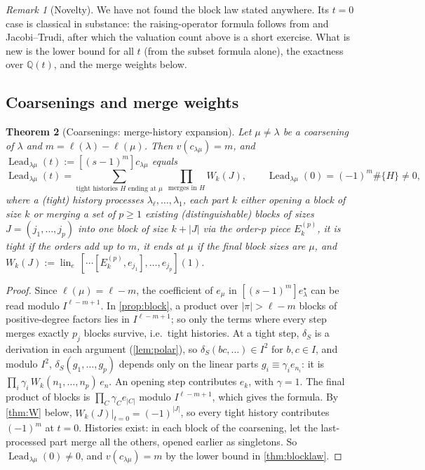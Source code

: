 \documentclass[11pt]{amsart}
\newtheorem{theorem}{Theorem}[section]
\theoremstyle{definition}
\theoremstyle{remark}
\newtheorem{remark}[theorem]{Remark}
\numberwithin{equation}{section}
\newcommand{\lin}{\operatorname{lin}_e}
\newcommand{\Lead}{\operatorname{Lead}}
\newcommand{\val}{v}
\begin{document}
\begin{remark}[Novelty]
We have not found the block law stated anywhere. Its $t=0$ case is classical in substance: the raising-operator formula follows from \cite[eq.~(11)]{DLT94} and Jacobi--Trudi, after which the valuation count above is a short exercise. What is new is the lower bound for all $t$ (from the subset formula alone), the exactness over $\mathbb{Q}(t)$, and the merge weights below.
\end{remark}

\subsection{Coarsenings and merge weights}
\begin{theorem}[Coarsenings: merge-history expansion]\label{thm:coarse}
Let $\mu\neq\lambda$ be a coarsening of $\lambda$ and $m=\ell(\lambda)-\ell(\mu)$. Then $\val(c_{\lambda\mu})=m$, and $\Lead_{\lambda\mu}(t):=[(s-1)^m]c_{\lambda\mu}$ equals
\[ \Lead_{\lambda\mu}(t)=\sum_{\text{tight histories }H\text{ ending at }\mu}\ \prod_{\text{merges in }H}W_k(J),\qquad \Lead_{\lambda\mu}(0)=(-1)^m\#\{H\}\neq0, \]
where a (tight) history processes $\lambda_\ell,\dots,\lambda_1$, each part $k$ either opening a block of size $k$ or merging a set of $p\ge1$ existing (distinguishable) blocks of sizes $J=(j_1,\dots,j_p)$ into one block of size $k+|J|$ via the order-$p$ piece $E_k^{(p)}$, it is tight if the orders add up to $m$, it ends at $\mu$ if the final block sizes are $\mu$, and $W_k(J):=\lin\,[\cdots[E_k^{(p)},e_{j_1}],\dots,e_{j_p}](1)$.
\end{theorem}
\begin{proof}
Since $\ell(\mu)=\ell-m$, the coefficient of $e_\mu$ in $[(s-1)^m]e^\star_\lambda$ can be read modulo $I^{\ell-m+1}$. In \cref{prop:block}, a product over $|\pi|>\ell-m$ blocks of positive-degree factors lies in $I^{\ell-m+1}$; so only the terms where every step merges exactly $p_j$ blocks survive, i.e.\ tight histories. At a tight step, $\delta_S$ is a derivation in each argument (\cref{lem:polar}), so $\delta_S(bc,\dots)\in I^2$ for $b,c\in I$, and modulo $I^2$, $\delta_S(g_1,\dots,g_p)$ depends only on the linear parts $g_i\equiv\gamma_ie_{n_i}$: it is $\prod_i\gamma_i\,W_k(n_1,\dots,n_p)\,e_n$. An opening step contributes $e_k$, with $\gamma=1$. The final product of blocks is $\prod_C\gamma_Ce_{|C|}$ modulo $I^{\ell-m+1}$, which gives the formula. By \cref{thm:W} below, $W_k(J)|_{t=0}=(-1)^{|J|}$, so every tight history contributes $(-1)^m$ at $t=0$. Histories exist: in each block of the coarsening, let the last-processed part merge all the others, opened earlier as singletons. So $\Lead_{\lambda\mu}(0)\ne0$, and $\val(c_{\lambda\mu})=m$ by the lower bound in \cref{thm:blocklaw}.
\end{proof}
\end{document}
